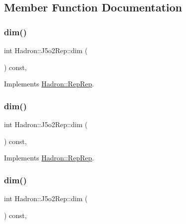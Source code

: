 \subsection{Member Function Documentation}
\mbox{\label{structHadron_1_1J5o2Rep_a0a185f6fcbb5ce65c0af1615cf1f4e76}} 
\subsubsection{\texorpdfstring{dim()}{dim()}\hspace{0.1cm}{\footnotesize\ttfamily [1/5]}}
{\footnotesize\ttfamily int Hadron\+::\+J5o2\+Rep\+::dim (\begin{DoxyParamCaption}{ }\end{DoxyParamCaption}) const\hspace{0.3cm}{\ttfamily [inline]}, {\ttfamily [virtual]}}



Implements \mbox{\hyperlink{structHadron_1_1RepRep_a92c8802e5ed7afd7da43ccfd5b7cd92b}{Hadron\+::\+Rep\+Rep}}.

\mbox{\label{structHadron_1_1J5o2Rep_a0a185f6fcbb5ce65c0af1615cf1f4e76}} 
\subsubsection{\texorpdfstring{dim()}{dim()}\hspace{0.1cm}{\footnotesize\ttfamily [2/5]}}
{\footnotesize\ttfamily int Hadron\+::\+J5o2\+Rep\+::dim (\begin{DoxyParamCaption}{ }\end{DoxyParamCaption}) const\hspace{0.3cm}{\ttfamily [inline]}, {\ttfamily [virtual]}}



Implements \mbox{\hyperlink{structHadron_1_1RepRep_a92c8802e5ed7afd7da43ccfd5b7cd92b}{Hadron\+::\+Rep\+Rep}}.

\mbox{\label{structHadron_1_1J5o2Rep_a0a185f6fcbb5ce65c0af1615cf1f4e76}} 
\subsubsection{\texorpdfstring{dim()}{dim()}\hspace{0.1cm}{\footnotesize\ttfamily [3/5]}}
{\footnotesize\ttfamily int Hadron\+::\+J5o2\+Rep\+::dim (\begin{DoxyParamCaption}{ }\end{DoxyParamCaption}) const\hspace{0.3cm}{\ttfamily [inline]}, {\ttfamily [virtual]}}



